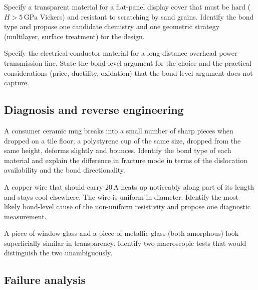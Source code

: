 \begin{exercise}
Specify a transparent material for a flat-panel display cover that
must be hard ($H > 5\,\text{GPa}$ Vickers) and resistant to scratching
by sand grains. Identify the bond type and propose one candidate
chemistry and one geometric strategy (multilayer, surface treatment)
for the design.
\end{exercise}

\begin{exercise}
Specify the electrical-conductor material for a long-distance
overhead power transmission line. State the bond-level argument for
the choice and the practical considerations (price, ductility,
oxidation) that the bond-level argument does not capture.
\end{exercise}

\subsection*{Diagnosis and reverse engineering}

\begin{exercise}
A consumer ceramic mug breaks into a small number of sharp pieces
when dropped on a tile floor; a polystyrene cup of the same size,
dropped from the same height, deforms slightly and bounces. Identify
the bond type of each material and explain the difference in
fracture mode in terms of the dislocation availability and the bond
directionality.
\end{exercise}

\begin{exercise}
A copper wire that should carry $20\,\text{A}$ heats up noticeably
along part of its length and stays cool elsewhere. The wire is uniform
in diameter. Identify the most likely bond-level cause of the
non-uniform resistivity and propose one diagnostic measurement.
\end{exercise}

\begin{exercise}
A piece of window glass and a piece of metallic glass (both amorphous)
look superficially similar in transparency. Identify two macroscopic
tests that would distinguish the two unambiguously.
\end{exercise}

\subsection*{Failure analysis}

